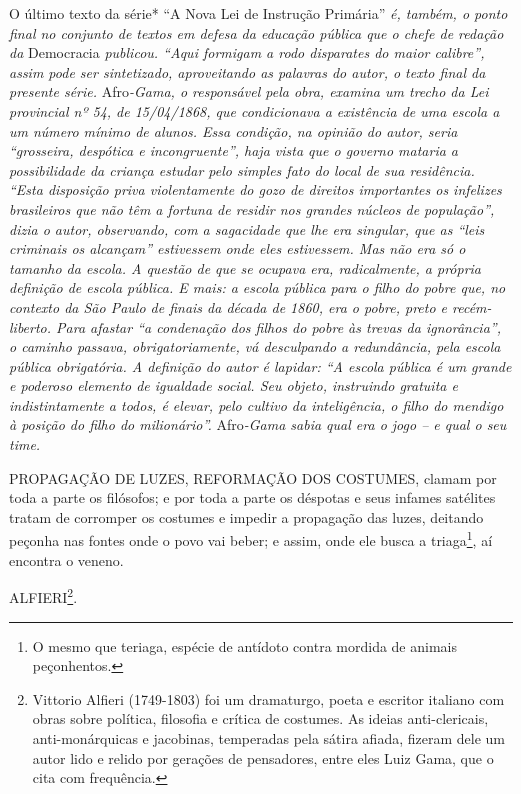 \begin{didascalia}
O último texto da série* ``A Nova Lei de Instrução Primária'' \emph{é,
também, o ponto final no conjunto de textos em defesa da educação
pública que o chefe de redação da} Democracia \emph{publicou. ``Aqui
formigam a rodo disparates do maior calibre'', assim pode ser
sintetizado, aproveitando as palavras do autor, o texto final da
presente série.} Afro\emph{-Gama, o responsável pela obra, examina um
trecho da Lei provincial nº 54, de 15/04/1868, que condicionava a
existência de uma escola a um número mínimo de alunos. Essa condição, na
opinião do autor, seria ``grosseira, despótica e incongruente'', haja
vista que o governo mataria a possibilidade da criança estudar pelo
simples fato do local de sua residência. ``Esta disposição priva
violentamente do gozo de direitos importantes os infelizes brasileiros
que não têm a fortuna de residir nos grandes núcleos de população'',
dizia o autor, observando, com a sagacidade que lhe era singular, que as
``leis criminais os alcançam'' estivessem onde eles estivessem. Mas não
era só o tamanho da escola. A questão de que se ocupava era,
radicalmente, a própria definição de escola pública. E mais: a escola
pública para o filho do pobre que, no contexto da São Paulo de finais da
década de 1860, era o pobre, preto e recém-liberto. Para afastar ``a
condenação dos filhos do pobre às trevas da ignorância'', o caminho
passava, obrigatoriamente, vá desculpando a redundância, pela escola
pública obrigatória. A definição do autor é lapidar: ``A escola pública é
um grande e poderoso elemento de igualdade social. Seu objeto,
instruindo gratuita e indistintamente a todos, é elevar, pelo cultivo da
inteligência, o filho do mendigo à posição do filho do milionário''.}
Afro\emph{-Gama sabia qual era o jogo -- e qual o seu time.}
\end{didascalia}

\asterisc{}

PROPAGAÇÃO DE LUZES, REFORMAÇÃO DOS COSTUMES, clamam por toda a parte os
filósofos; e por toda a parte os déspotas e seus infames satélites
tratam de corromper os costumes e impedir a propagação das luzes,
deitando peçonha nas fontes onde o povo vai beber; e assim, onde ele
busca a triaga\footnote{O mesmo que teriaga, espécie de antídoto
  contra mordida de animais peçonhentos.}, aí encontra o veneno.

ALFIERI\footnote{Vittorio Alfieri (1749-1803) foi um dramaturgo, poeta
  e escritor italiano com obras sobre política, filosofia e crítica de
  costumes. As ideias anti-clericais, anti-monárquicas e jacobinas,
  temperadas pela sátira afiada, fizeram dele um autor lido e relido por
  gerações de pensadores, entre eles Luiz Gama, que o cita com
  frequência.}.

